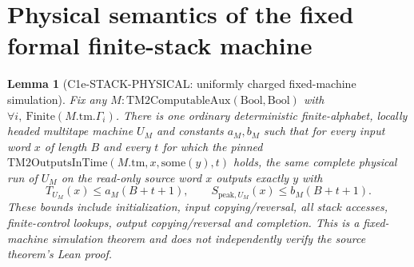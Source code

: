 \documentclass[11pt]{article}
\newtheorem{lemma}{Lemma}
\begin{document}
\section{Physical semantics of the fixed formal finite-stack machine}
\begin{lemma}[C1e-STACK-PHYSICAL: uniformly charged fixed-machine simulation]
Fix any $M:\mathrm{TM2ComputableAux}(\mathrm{Bool},\mathrm{Bool})$
with $\forall i,\ \mathrm{Finite}(M.\mathrm{tm}.\Gamma_i)$.
There is one ordinary deterministic finite-alphabet, locally headed
multitape machine $U_M$ and constants $a_M,b_M$ such that for every
input word $x$ of length $B$ and every $t$ for which the pinned
$\mathrm{TM2OutputsInTime}(M.\mathrm{tm},x,\mathrm{some}(y),t)$
holds, the \emph{same complete physical run} of $U_M$ on the
read-only source word $x$ outputs exactly $y$ with
\[
 T_{U_M}(x)\le a_M(B+t+1),\qquad
 S_{\mathrm{peak},U_M}(x)\le b_M(B+t+1).
\]
These bounds include initialization, input copying/reversal, all
stack accesses, finite-control lookups, output copying/reversal and
completion. This is a fixed-machine simulation theorem and does
not independently verify the source theorem's Lean proof.
\end{lemma}
\end{document}
